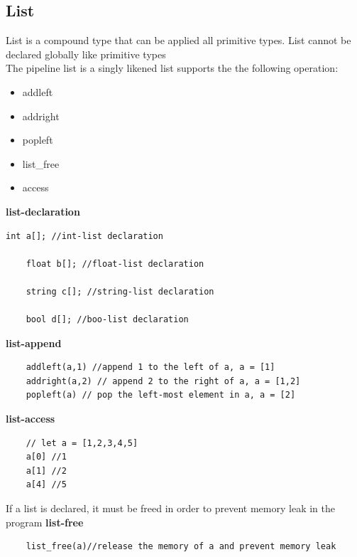 \documentclass[./Report_main.tex]{subfiles}
\begin{document}
\subsection{List}
List is a compound type that can be applied all primitive types. List cannot be declared globally like primitive types\\
The pipeline list is a singly likened list supports the the following operation:\\
\begin{itemize}
    \item addleft
    \item addright
    \item popleft
    \item list\_free
    \item access
\end{itemize}
\textbf{list-declaration}
\begin{lstlisting}[]
    int a[]; //int-list declaration
    
    float b[]; //float-list declaration
    
    string c[]; //string-list declaration
    
    bool d[]; //boo-list declaration
\end{lstlisting}
\textbf{list-append}
\begin{lstlisting}
    addleft(a,1) //append 1 to the left of a, a = [1]
    addright(a,2) // append 2 to the right of a, a = [1,2]
    popleft(a) // pop the left-most element in a, a = [2]
\end{lstlisting}
\textbf{list-access}
\begin{lstlisting}
    // let a = [1,2,3,4,5]
    a[0] //1
    a[1] //2
    a[4] //5
\end{lstlisting}
If a list is declared, it must be freed in order to prevent memory leak in the program
\textbf{list-free}
\begin{lstlisting}
    list_free(a)//release the memory of a and prevent memory leak
\end{lstlisting}
\end{document}
